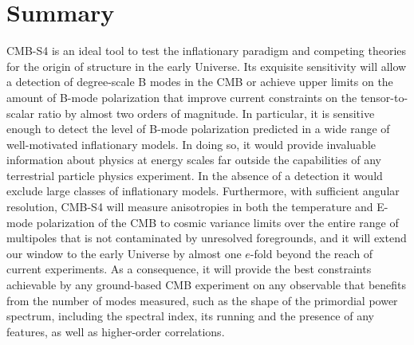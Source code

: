 
\section{Summary}
\label{sec:summary}
CMB-S4 is an ideal tool to test the inflationary paradigm and competing theories for the origin of structure in the early Universe. Its exquisite sensitivity will allow a detection of degree-scale B modes in the CMB or achieve upper limits on the amount of B-mode polarization that improve current constraints on the tensor-to-scalar ratio by almost two orders of magnitude. In particular, it is sensitive enough to detect the level of B-mode polarization predicted in a wide range of well-motivated inflationary models. In doing so, it would provide invaluable information about physics at energy scales far outside the capabilities of any terrestrial particle physics experiment. In the absence of a detection it would exclude large classes of inflationary models. Furthermore, with sufficient angular resolution, CMB-S4 will measure anisotropies in both the temperature and E-mode polarization of the CMB to cosmic variance limits over the entire range of multipoles that is not contaminated by unresolved foregrounds, and it will extend our window to the early Universe by almost one $e$-fold beyond the reach of current experiments. As a consequence, it will provide the best constraints achievable by any ground-based CMB experiment on any observable that benefits from the number of modes measured, such as the shape of the primordial power spectrum, including the spectral index, its running and the presence of any features, as well as higher-order correlations.


 
